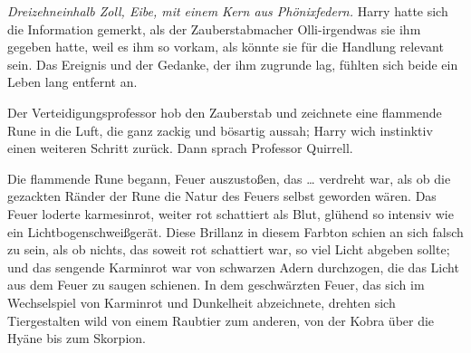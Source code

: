 \emph{Dreizehneinhalb Zoll, Eibe, mit einem Kern aus Phönixfedern.}
Harry hatte sich die Information gemerkt, als der Zauberstabmacher Olli-irgendwas sie ihm gegeben hatte, weil es ihm so vorkam, als könnte sie für die Handlung relevant sein. Das Ereignis und der Gedanke, der ihm zugrunde lag, fühlten sich beide ein Leben lang entfernt an.

Der Verteidigungsprofessor hob den Zauberstab und zeichnete eine flammende Rune in die Luft, die ganz zackig und bösartig aussah; Harry wich instinktiv einen weiteren Schritt zurück. Dann sprach Professor Quirrell. 

Die flammende Rune begann, Feuer auszustoßen, das … verdreht war, als ob die gezackten Ränder der Rune die Natur des Feuers selbst geworden wären. Das Feuer loderte karmesinrot, weiter rot schattiert als Blut, glühend so intensiv wie ein Lichtbogenschweißgerät. Diese Brillanz in diesem Farbton schien an sich falsch zu sein, als ob nichts, das soweit rot schattiert war, so viel Licht abgeben sollte; und das sengende Karminrot war von schwarzen Adern durchzogen, die das Licht aus dem Feuer zu saugen schienen. In dem geschwärzten Feuer, das sich im Wechselspiel von Karminrot und Dunkelheit abzeichnete, drehten sich Tiergestalten wild von einem Raubtier zum anderen, von der Kobra über die Hyäne bis zum Skorpion.

